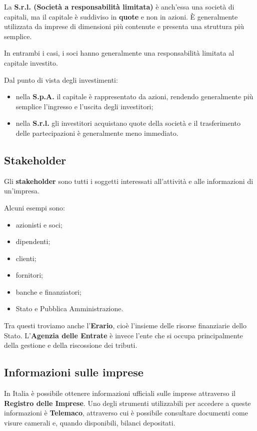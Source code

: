 \noindent La \textbf{S.r.l. (Società a responsabilità limitata)} è anch'essa una società di capitali, 
ma il capitale è suddiviso in \textbf{quote} e non in azioni. È generalmente utilizzata da imprese di dimensioni 
più contenute e presenta una struttura più semplice.

\noindent In entrambi i casi, i soci hanno generalmente una responsabilità limitata al capitale investito.

\noindent Dal punto di vista degli investimenti:
\begin{itemize}
    \item nella \textbf{S.p.A.} il capitale è rappresentato da azioni, rendendo generalmente più semplice 
    l'ingresso e l'uscita degli investitori;
    \item nella \textbf{S.r.l.} gli investitori acquistano quote della società e il trasferimento delle 
    partecipazioni è generalmente meno immediato.
\end{itemize}

\subsection{Stakeholder}
Gli \textbf{stakeholder} sono tutti i soggetti interessati all'attività e alle informazioni di un'impresa.

\noindent Alcuni esempi sono:
\begin{itemize}
    \item azionisti e soci;
    \item dipendenti;
    \item clienti;
    \item fornitori;
    \item banche e finanziatori;
    \item Stato e Pubblica Amministrazione.
\end{itemize}

\noindent Tra questi troviamo anche l'\textbf{Erario}, cioè l'insieme delle risorse finanziarie 
dello Stato. L'\textbf{Agenzia delle Entrate} è invece l'ente che si occupa principalmente della gestione e della riscossione dei tributi.

\subsection{Informazioni sulle imprese}
In Italia è possibile ottenere informazioni ufficiali sulle imprese attraverso il \textbf{Registro delle Imprese}. 
Uno degli strumenti utilizzabili per accedere a queste informazioni è \textbf{Telemaco}, attraverso cui è possibile consultare documenti 
come visure camerali e, quando disponibili, bilanci depositati.

